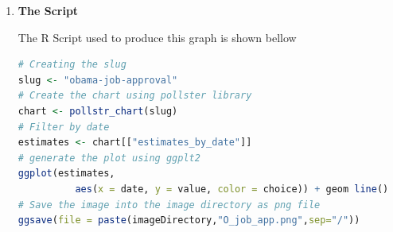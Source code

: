 \documentclass{article}[14pt]
\begin{document}
\begin{section}
\begin{enumerate}[]
\item {\bf The Script}

The R Script used to produce this graph is shown bellow

\begin{lstlisting}[language = R]
# Creating the slug 
slug <- "obama-job-approval" 
# Create the chart using pollster library 
chart <- pollstr_chart(slug)
# Filter by date
estimates <- chart[["estimates_by_date"]]
# generate the plot using ggplt2
ggplot(estimates, 
          aes(x = date, y = value, color = choice)) + geom line()
# Save the image into the image directory as png file 
ggsave(file = paste(imageDirectory,"O_job_app.png",sep="/")) 
\end{lstlisting}

\end{enumerate}
 
\bigskip
\end{section}
\end{document}
